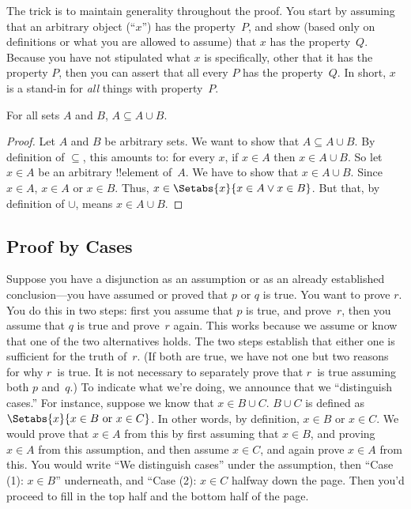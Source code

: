 \documentclass[../../../include/open-logic-section]{subfiles}
\begin{document}
The trick is to maintain generality throughout the proof. You start by
assuming that an arbitrary object (``$x$'') has the property~$P$, and
show (based only on definitions or what you are allowed to assume)
that $x$ has the property~$Q$. Because you have not stipulated what
$x$ is specifically, other that it has the property $P$, then you can
assert that all every $P$ has the property~$Q$. In short, $x$ is a
stand-in for \emph{all} things with property~$P$.

\begin{prop}
  For all sets $A$ and $B$, $A \subseteq A \cup B$.
\end{prop}

\begin{proof}
  Let $A$ and $B$ be arbitrary sets.  We want to show that $A
  \subseteq A \cup B$. By definition of $\subseteq$, this amounts to:
  for every $x$, if $x \in A$ then $x \in A \cup B$. So let $x \in A$
  be an arbitrary !!{element} of~$A$. We have to show that $x \in A
  \cup B$. Since $x \in A$, $x \in A$ or $x \in B$. Thus, $x \in
  \Setabs{x}{x \in A \lor x \in B}$. But that, by definition of $\cup
  $, means $x \in A \cup B$.
\end{proof}


\subsection{Proof by Cases}

Suppose you have a disjunction as an assumption or as an already
established conclusion---you have assumed or proved that $p$ or $q$ is
true.  You want to prove $r$.  You do this in two steps: first you
assume that $p$ is true, and prove~$r$, then you assume that $q$ is
true and prove~$r$ again.  This works because we assume or know that
one of the two alternatives holds. The two steps establish that either
one is sufficient for the truth of~$r$.  (If both are true, we have
not one but two reasons for why $r$~is true. It is not necessary to
separately prove that $r$~is true assuming both $p$ and~$q$.)  To
indicate what we're doing, we announce that we ``distinguish cases.''
For instance, suppose we know that $x \in B \cup C$.  $B \cup C$ is
defined as $\Setabs{x}{x \in B \text{ or } x \in C}$. In other words,
by definition, $x \in B$ or $x \in C$. We would prove that $x \in A$
from this by first assuming that $x \in B$, and proving $x \in A$ from
this assumption, and then assume $x \in C$, and again prove $x \in A$
from this.  You would write ``We distinguish cases'' under the
assumption, then ``Case (1): $x \in B$'' underneath, and ``Case (2):
$x \in C$ halfway down the page. Then you'd proceed to fill in the top
half and the bottom half of the page.
\end{document}
